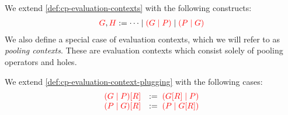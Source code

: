 \begin{definition}\label{def:nc-evaluation-contexts}
  We extend \cref{def:cp-evaluation-contexts} with the following constructs:
  \begin{align*}
    \textcolor{red}{G}, \textcolor{red}{H} := \dots \mid \textcolor{red}{(G \mid P)} \mid \textcolor{red}{(P \mid G)}
  \end{align*}
  We also define a special case of evaluation contexts, which we will refer to
  as \emph{pooling contexts}. These are evaluation contexts which consist solely
  of pooling operators and holes.
\end{definition}
\begin{definition}[Plugging]\label{def:nc-evaluation-context-plugging}
  We extend \cref{def:cp-evaluation-context-plugging} with the following cases:
  \begin{gather*}
    \begin{array}{ll}
      \textcolor{red}{{(G \mid P)}[{R}]}
      & := \; \textcolor{red}{({G}[{R}] \mid P)}
      \\
      \textcolor{red}{{(P \mid G)}[{R}]}
      & := \; \textcolor{red}{(P \mid {G}[{R}])}
    \end{array}
  \end{gather*}
\end{definition}
